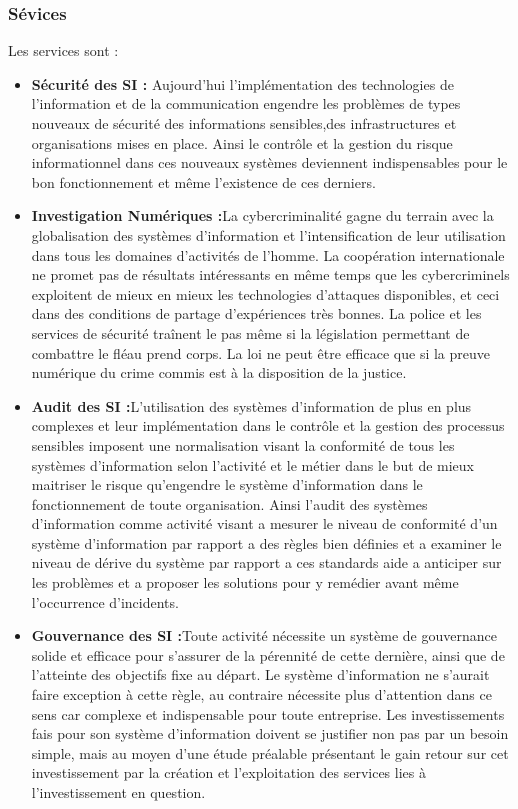 				\subsubsection{Sévices}
					Les services sont :
						\begin{itemize}
							  \item \textbf{Sécurité des SI :} Aujourd'hui l’implémentation des technologies de l'information et de la communication engendre les problèmes de types nouveaux de sécurité des informations sensibles,des infrastructures et organisations mises en place. Ainsi le contrôle et la gestion du risque informationnel dans ces nouveaux systèmes deviennent indispensables pour le bon fonctionnement et même l’existence de ces derniers. 
       						  \item \textbf{Investigation Numériques :}La cybercriminalité gagne du terrain avec la globalisation des systèmes d’information et l’intensification de leur utilisation dans tous les domaines d’activités de l’homme. La coopération internationale ne promet pas de résultats intéressants en même temps que les cybercriminels exploitent de mieux en mieux les technologies d’attaques disponibles, et ceci dans des conditions de partage d’expériences très bonnes. La police et les services de sécurité traînent le pas même si la législation permettant de combattre le fléau prend corps. La loi ne peut être efficace que si la preuve numérique du crime commis est à la disposition de la justice.
       						  \item \textbf{Audit des SI :}L’utilisation des systèmes d’information de plus en plus complexes et leur implémentation dans le contrôle et la gestion des processus sensibles imposent une normalisation visant la conformité de tous les systèmes d’information selon l’activité et le métier dans le but de mieux maitriser le risque qu’engendre le système d’information dans le fonctionnement de toute organisation. Ainsi l’audit des systèmes d’information comme activité visant a mesurer le niveau de conformité d’un système d’information par rapport a des règles bien définies et a examiner le niveau de dérive du système par rapport a ces standards aide a anticiper sur les problèmes et a proposer les solutions pour y remédier avant même l’occurrence d’incidents.
     						  \item \textbf{Gouvernance des SI :}Toute activité nécessite un système de gouvernance solide et efficace pour s’assurer de la pérennité de cette dernière, ainsi que de l’atteinte des objectifs fixe au départ. Le système d’information ne s’aurait faire exception à cette règle, au contraire nécessite plus d’attention dans ce sens car complexe et indispensable pour toute entreprise. Les investissements fais pour son système d’information doivent se justifier non pas par un besoin simple, mais au moyen d’une étude préalable présentant le gain retour sur cet investissement par la création et l’exploitation des services lies à l’investissement en question.
						\end{itemize}
